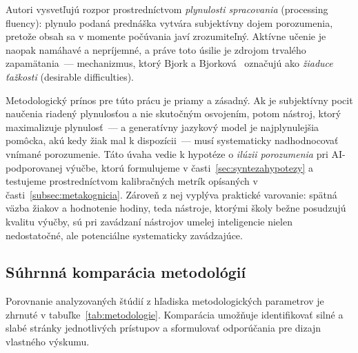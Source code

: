 Autori vysvetľujú rozpor prostredníctvom \emph{plynulosti spracovania} (processing fluency): plynulo podaná prednáška vytvára subjektívny dojem porozumenia, pretože obsah sa v momente počúvania javí zrozumiteľný. Aktívne učenie je naopak namáhavé a nepríjemné, a práve toto úsilie je zdrojom trvalého zapamätania~--- mechanizmus, ktorý Bjork a Bjorková~\cite{bjork2011desirable} označujú ako \emph{žiaduce ťažkosti} (desirable difficulties).

Metodologický prínos pre túto prácu je priamy a zásadný. Ak je subjektívny pocit naučenia riadený plynulosťou a nie skutočným osvojením, potom nástroj, ktorý maximalizuje plynulosť~--- a generatívny jazykový model je najplynulejšia pomôcka, akú kedy žiak mal k dispozícii~--- musí systematicky nadhodnocovať vnímané porozumenie. Táto úvaha vedie k hypotéze o \emph{ilúzii porozumenia} pri AI-podporovanej výučbe, ktorú formulujeme v časti~\ref{sec:syntezahypotezy} a testujeme prostredníctvom kalibračných metrík opísaných v časti~\ref{subsec:metakognicia}. Zároveň z nej vyplýva praktické varovanie: spätná väzba žiakov a hodnotenie hodiny, teda nástroje, ktorými školy bežne posudzujú kvalitu výučby, sú pri zavádzaní nástrojov umelej inteligencie nielen nedostatočné, ale potenciálne systematicky zavádzajúce.


\subsection{Súhrnná komparácia metodológií}

Porovnanie analyzovaných štúdií z hľadiska metodologických parametrov je zhrnuté v tabuľke~\ref{tab:metodologie}. Komparácia umožňuje identifikovať silné a slabé stránky jednotlivých prístupov a sformulovať odporúčania pre dizajn vlastného výskumu.

